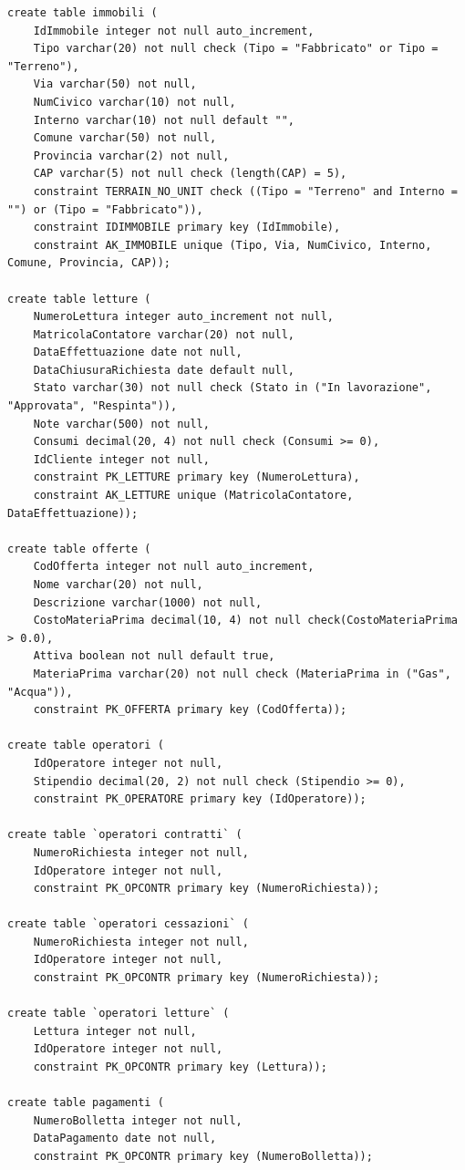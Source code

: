 \documentclass[a4paper,12pt]{report}
\begin{document}
\begin{lstlisting}
create table immobili (
    IdImmobile integer not null auto_increment,
    Tipo varchar(20) not null check (Tipo = "Fabbricato" or Tipo = "Terreno"),
    Via varchar(50) not null,
    NumCivico varchar(10) not null,
    Interno varchar(10) not null default "",
    Comune varchar(50) not null,
    Provincia varchar(2) not null,
    CAP varchar(5) not null check (length(CAP) = 5),
    constraint TERRAIN_NO_UNIT check ((Tipo = "Terreno" and Interno = "") or (Tipo = "Fabbricato")),
    constraint IDIMMOBILE primary key (IdImmobile),
    constraint AK_IMMOBILE unique (Tipo, Via, NumCivico, Interno, Comune, Provincia, CAP));

create table letture (
    NumeroLettura integer auto_increment not null,
    MatricolaContatore varchar(20) not null,
    DataEffettuazione date not null,
    DataChiusuraRichiesta date default null,
    Stato varchar(30) not null check (Stato in ("In lavorazione", "Approvata", "Respinta")),
    Note varchar(500) not null,
    Consumi decimal(20, 4) not null check (Consumi >= 0),
    IdCliente integer not null,
    constraint PK_LETTURE primary key (NumeroLettura),
    constraint AK_LETTURE unique (MatricolaContatore, DataEffettuazione));

create table offerte (
    CodOfferta integer not null auto_increment,
    Nome varchar(20) not null,
    Descrizione varchar(1000) not null,
    CostoMateriaPrima decimal(10, 4) not null check(CostoMateriaPrima > 0.0),
    Attiva boolean not null default true,
    MateriaPrima varchar(20) not null check (MateriaPrima in ("Gas", "Acqua")),
    constraint PK_OFFERTA primary key (CodOfferta));

create table operatori (
    IdOperatore integer not null,
    Stipendio decimal(20, 2) not null check (Stipendio >= 0),
    constraint PK_OPERATORE primary key (IdOperatore));
    
create table `operatori contratti` (
    NumeroRichiesta integer not null,
    IdOperatore integer not null,
    constraint PK_OPCONTR primary key (NumeroRichiesta));
    
create table `operatori cessazioni` (
    NumeroRichiesta integer not null,
    IdOperatore integer not null,
    constraint PK_OPCONTR primary key (NumeroRichiesta));
    
create table `operatori letture` (
    Lettura integer not null,
    IdOperatore integer not null,
    constraint PK_OPCONTR primary key (Lettura));
    
create table pagamenti (
    NumeroBolletta integer not null,
    DataPagamento date not null,
    constraint PK_OPCONTR primary key (NumeroBolletta));


\end{lstlisting}
\end{document}
